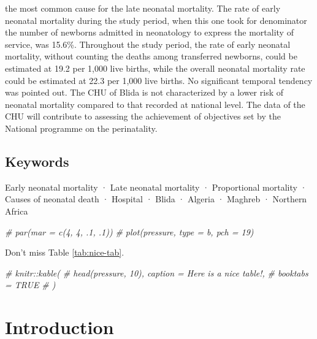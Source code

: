\documentclass[
]{book}
\newenvironment{Shaded}{\begin{snugshade}}{\end{snugshade}}
\newcommand{\CommentTok}[1]{\textcolor[rgb]{0.56,0.35,0.01}{\textit{#1}}}
\begin{document}
the most common cause for the late neonatal mortality. The
rate of early neonatal mortality during the study period, when
this one took for denominator the number of newborns
admitted in neonatology to express the mortality of service,
was 15.6\%. Throughout the study period, the rate of early
neonatal mortality, without counting the deaths among
transferred newborns, could be estimated at 19.2 per 1,000
live births, while the overall neonatal mortality rate could
be estimated at 22.3 per 1,000 live births. No significant
temporal tendency was pointed out. The CHU of Blida is not
characterized by a lower risk of neonatal mortality compared
to that recorded at national level. The data of the CHU will
contribute to assessing the achievement of objectives set by
the National programme on the perinatality.

\hypertarget{keywords}{%
\section{Keywords}\label{keywords}}

Early neonatal mortality · Late neonatal mortality ·
Proportional mortality · Causes of neonatal death ·
Hospital · Blida · Algeria · Maghreb · Northern Africa

\begin{Shaded}
\begin{Highlighting}[]
\CommentTok{\# par(mar = c(4, 4, .1, .1))}
\CommentTok{\# plot(pressure, type = \textquotesingle{}b\textquotesingle{}, pch = 19)}
\end{Highlighting}
\end{Shaded}

Don't miss Table \ref{tab:nice-tab}.

\begin{Shaded}
\begin{Highlighting}[]
\CommentTok{\# knitr::kable(}
\CommentTok{\#   head(pressure, 10), caption = \textquotesingle{}Here is a nice table!\textquotesingle{},}
\CommentTok{\#   booktabs = TRUE}
\CommentTok{\# )}
\end{Highlighting}
\end{Shaded}

\hypertarget{introduction}{%
\chapter{Introduction}\label{introduction}}
\end{document}

